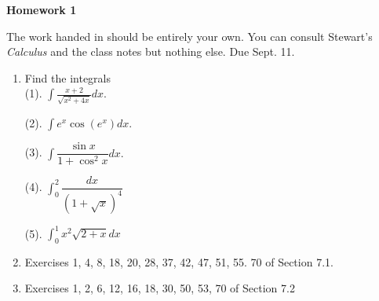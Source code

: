 \documentclass[12pt]{article}
\title{}
\date{}
\theoremstyle{plain}
\theoremstyle{definition}
\theoremstyle{remark}
\begin{document}
\begin{center}
{\Large \bf Homework 1}
\end{center}
The work handed in should be entirely your own. You can consult Stewart's {\it Calculus} and the class notes but nothing else. Due Sept. 11.

\begin{enumerate}
\item
Find the integrals \\
(1). $\int \frac{x+2}{\sqrt{x^2+4x}} dx$.

(2). $\int e^x \cos(e^x) dx.$

(3). $\int \dfrac{\sin x}{1+ \cos^2 x} dx.$

(4). $\int_0^2 \dfrac{dx}{(1+\sqrt{x})^4}$

(5). $\int_0^1 x^2 \sqrt{2+x}dx$

\item Exercises 1, 4, 8, 18, 20, 28, 37, 42, 47, 51, 55. 70 of Section 7.1.

\item Exercises 1, 2, 6, 12, 16, 18, 30, 50, 53, 70 of Section 7.2


\end{enumerate}
\end{document}
